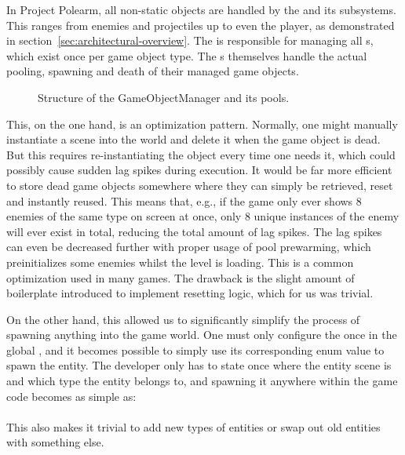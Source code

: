 \documentclass[../Main.tex]{subfiles}
\begin{document}
In Project Polearm, all non-static objects are handled by the  and its subsystems. This ranges from enemies and projectiles up to even the player, as demonstrated in section~\ref{sec:architectural-overview}. The  is responsible for managing all s, which exist once per game object type. The s themselves handle the actual pooling, spawning and death of their managed game objects.

\begin{figure}[H]
    \centering
    
    \caption[Structure of the GameObjectManager and its pools. Own figure.]{Structure of the GameObjectManager and its pools.}
    \label{fig:game-object-manager}
\end{figure}

This, on the one hand, is an optimization pattern\autocite[]{nystrom_objectpool}. Normally, one might manually instantiate a scene into the world and delete it when the game object is dead. But this requires re-instantiating the object every time one needs it, which could possibly cause sudden lag spikes during execution. It would be far more efficient to store dead game objects somewhere where they can simply be retrieved, reset and instantly reused. This means that, e.g., if the game only ever shows 8 enemies of the same type on screen at once, only 8 unique instances of the enemy will ever exist in total, reducing the total amount of lag spikes. The lag spikes can even be decreased further with proper usage of pool prewarming, which preinitializes some enemies whilst the level is loading. This is a common optimization used in many games. The drawback is the slight amount of boilerplate introduced to implement resetting logic, which for us was trivial.

On the other hand, this allowed us to significantly simplify the process of spawning anything into the game world. One must only configure the  once in the global , and it becomes possible to simply use its corresponding enum value to spawn the entity. The developer only has to state once where the entity scene is and which type the entity belongs to, and spawning it anywhere within the game code becomes as simple as: \\
 \\
This also makes it trivial to add new types of entities or swap out old entities with something else.
\end{document}
